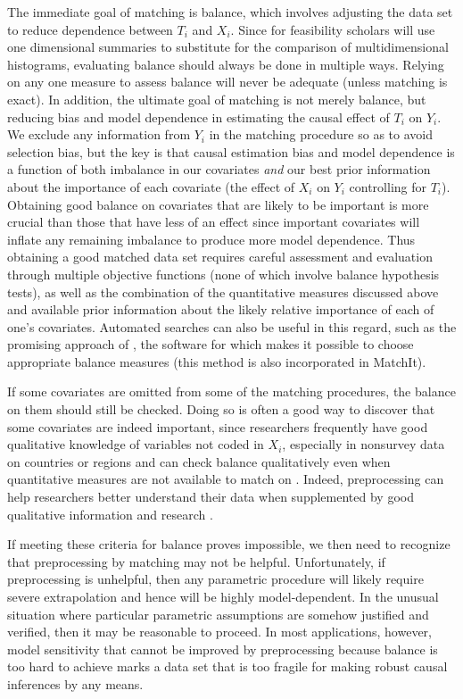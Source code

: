 \documentclass[11pt,titlepage]{article}
\begin{document}
The immediate goal of matching is balance, which involves adjusting
the data set to reduce dependence between $T_i$ and $X_i$.  Since for
feasibility scholars will use one dimensional summaries to substitute
for the comparison of multidimensional histograms, evaluating balance
should always be done in multiple ways.  Relying on any one measure to
assess balance will never be adequate (unless matching is exact).  In
addition, the ultimate goal of matching is not merely balance, but
reducing bias and model dependence in estimating the causal effect of
$T_i$ on $Y_i$.  We exclude any information from $Y_i$ in the matching
procedure so as to avoid selection bias, but the key is that causal
estimation bias and model dependence is a function of both imbalance
in our covariates \emph{and} our best prior information about the
importance of each covariate (the effect of $X_i$ on $Y_i$ controlling
for $T_i$).  Obtaining good balance on covariates that are likely to
be important is more crucial than those that have less of an effect
since important covariates will inflate any remaining imbalance to
produce more model dependence.  Thus obtaining a good matched data set
requires careful assessment and evaluation through multiple objective
functions (none of which involve balance hypothesis tests), as well as
the combination of the quantitative measures discussed above and
available prior information about the likely relative importance of
each of one's covariates.  Automated searches can also be useful in
this regard, such as the promising approach of \citet{DiaSek05}, the
software for which makes it possible to choose appropriate balance
measures (this method is also incorporated in MatchIt).

If some covariates are omitted from some of the matching procedures,
the balance on them should still be checked.  Doing so is often a good
way to discover that some covariates are indeed important, since
researchers frequently have good qualitative knowledge of variables
not coded in $X_i$, especially in nonsurvey data on countries or
regions and can check balance qualitatively even when quantitative
measures are not available to match on \citep[][Ch.3]{Rosenbaum02}.
Indeed, preprocessing can help researchers better understand their
data when supplemented by good qualitative information and research
\citep[e.g.,][]{RosSil01}.

If meeting these criteria for balance proves impossible, we then need
to recognize that preprocessing by matching may not be helpful.
Unfortunately, if preprocessing is unhelpful, then any parametric
procedure will likely require severe extrapolation and hence will be
highly model-dependent.  In the unusual situation where particular
parametric assumptions are somehow justified and verified, then it may
be reasonable to proceed.  In most applications, however, model
sensitivity that cannot be improved by preprocessing because balance
is too hard to achieve marks a data set that is too fragile for making
robust causal inferences by any means.
\end{document}

